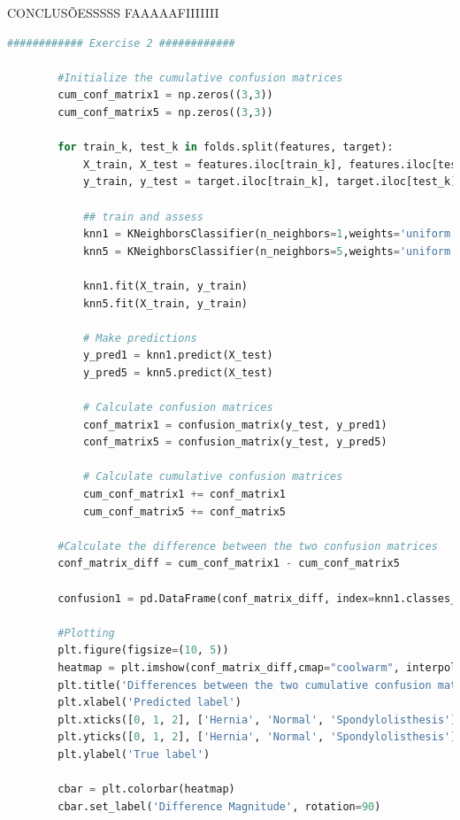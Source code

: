 \documentclass[a4paper,12pt]{article} %
\begin{document}
\begin{enumerate}
    CONCLUSÕESSSSS FAAAAAFIIIIIII

    \begin{lstlisting}[language=Python]
        ############ Exercise 2 ############

        #Initialize the cumulative confusion matrices
        cum_conf_matrix1 = np.zeros((3,3))
        cum_conf_matrix5 = np.zeros((3,3))
        
        for train_k, test_k in folds.split(features, target):
            X_train, X_test = features.iloc[train_k], features.iloc[test_k]
            y_train, y_test = target.iloc[train_k], target.iloc[test_k]
            
            ## train and assess
            knn1 = KNeighborsClassifier(n_neighbors=1,weights='uniform',metric='euclidean')
            knn5 = KNeighborsClassifier(n_neighbors=5,weights='uniform',metric='euclidean')
        
            knn1.fit(X_train, y_train)
            knn5.fit(X_train, y_train)
        
            # Make predictions
            y_pred1 = knn1.predict(X_test)
            y_pred5 = knn5.predict(X_test)
        
            # Calculate confusion matrices
            conf_matrix1 = confusion_matrix(y_test, y_pred1)
            conf_matrix5 = confusion_matrix(y_test, y_pred5)
        
            # Calculate cumulative confusion matrices
            cum_conf_matrix1 += conf_matrix1
            cum_conf_matrix5 += conf_matrix5
        
        #Calculate the difference between the two confusion matrices
        conf_matrix_diff = cum_conf_matrix1 - cum_conf_matrix5
        
        confusion1 = pd.DataFrame(conf_matrix_diff, index=knn1.classes_, columns=['Predicted Hernia', 'Predicted Normal', 'Predicted Spondylolisthesis'])
        
        #Plotting 
        plt.figure(figsize=(10, 5))
        heatmap = plt.imshow(conf_matrix_diff,cmap="coolwarm", interpolation='nearest')
        plt.title('Differences between the two cumulative confusion matrices (k1 - k5)')
        plt.xlabel('Predicted label')
        plt.xticks([0, 1, 2], ['Hernia', 'Normal', 'Spondylolisthesis'])
        plt.yticks([0, 1, 2], ['Hernia', 'Normal', 'Spondylolisthesis'])
        plt.ylabel('True label')
        
        cbar = plt.colorbar(heatmap)
        cbar.set_label('Difference Magnitude', rotation=90)
        

\end{lstlisting}
\end{enumerate}
\end{document}
